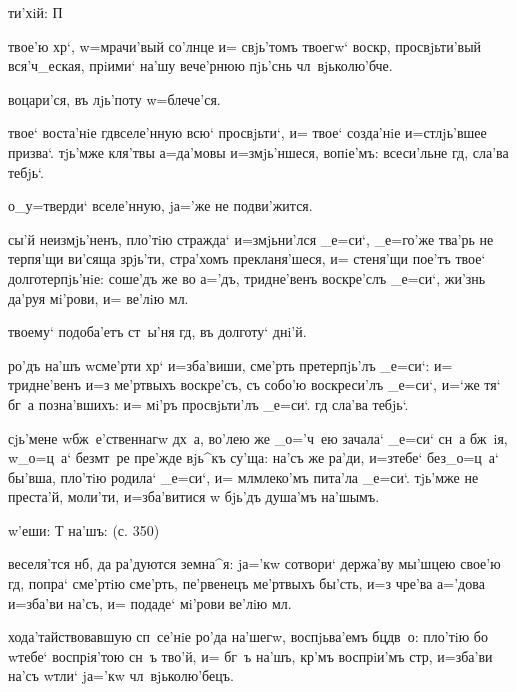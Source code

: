      ти'хiй: 
П


 твое'ю хр`, w=мрачи'вый со'лнце и= 
свjь'томъ твоегw` воскр, просвjьти'вый вся'ч_еская, 
прiими` на'шу вече'рнюю пjь'снь чл~вjьколю'бче.


 воцари'ся, въ лjь'поту w=блече'ся.

 твое` воста'нiе гд вселе'нную 
всю` просвjьти`, и= твое` созда'нiе и=стлjь'вшее призва`. 
тjь'мже кля'твы а=да'мовы и=змjь'ншеся, вопiе'мъ: 
всеси'льне гд, сла'ва тебjь`.

  о_у=тверди` вселе'нную, jа='же не 
подви'жится.

 сы'й неизмjь'ненъ, пло'тiю стражда` 
и=змjьни'лся _е=си`, _е=го'же тва'рь не терпя'щи ви'сяща 
зрjь'ти, стра'хомъ прекланя'шеся, и= стеня'щи пое'тъ 
твое` долготерпjь'нiе: соше'дъ же во а='дъ, тридне'венъ 
воскре'слъ _е=си`, жи'знь да'руя мi'рови, и= ве'лiю 
мл.

  твоему` подоба'етъ ст~ы'ня гд, въ 
долготу` днi'й.

 ро'дъ на'шъ w\т сме'рти хр` и=зба'виши, 
сме'рть претерпjь'лъ _е=си`: и= тридне'венъ и=з\ъ 
ме'ртвыхъ воскре'съ, съ собо'ю воскреси'лъ _е=си`, и=`же 
тя` бг~а позна'вшихъ: и= мi'ръ просвjьти'лъ _е=си`. гд 
сла'ва тебjь`.

     сjь'мене 
w\т бж~е'ственнагw дх~а, во'лею же _о='ч~ею зачала` 
_е=си` сн~а бж~iя, w\т _о=ц~а` без\ъ мт~ре пре'жде вjь^къ 
су'ща: на'съ же ра'ди, и=з\ъ тебе` без\ъ _о=ц~а` бы'вша, 
пло'тiю родила` _е=си`, и= мл млеко'мъ пита'ла 
_е=си`. тjь'мже не преста'й, моли'ти, и=зба'витися w\т 
бjь'дъ душа'мъ на'шымъ.

  w'еши: Т   на'шъ: (с. 350)


 веселя'тся нб, да ра'дуются земна^я: 
jа='кw сотвори` держа'ву мы'шцею свое'ю гд, попра` 
сме'ртiю сме'рть, пе'рвенецъ ме'ртвыхъ бы'сть, и=з\ъ 
чре'ва а='дова и=зба'ви на'съ, и= подаде` мi'рови ве'лiю 
мл.

     
хода'тайствовавшую сп~се'нiе ро'да на'шегw, воспjьва'емъ 
бц дв~о: пло'тiю бо w\т тебе` воспрiя'тою сн~ъ тво'й, 
и= бг~ъ на'шъ, кр'мъ воспрiи'мъ стр, и=зба'ви 
на'съ w\т тли` jа='кw чл~вjьколю'бецъ.

